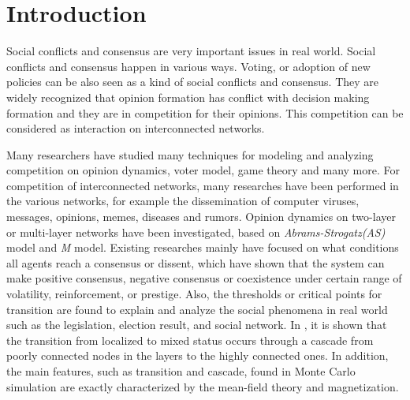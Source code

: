\documentclass[review]{elsarticle}
\begin{document}
\section{Introduction}
Social conflicts and consensus are very important issues in real world. Social conflicts and consensus happen in various ways. Voting, or adoption of new policies can be also seen as a kind of social conflicts and consensus. They are widely recognized that opinion formation has conflict with decision making formation and they are in competition for their opinions. This competition can be considered as interaction on interconnected networks\cite{bianconi2018,domenico2013,tomasini2015,kimsangwoo2012,newman2010,boccaletti2014,mikko2014,fangwu2004}. 

Many researchers have studied many techniques for modeling and analyzing competition on opinion dynamics\cite{amato2017,quattrociocchi2014,haibo2017, hua2014}, voter model\cite{redner2017}, game theory\cite{smyrnakis2019} and many more\cite{danziger2019,namkhanhvu2017,laguna2004,masuda2014,zuev2012, shenyu2018, zhou2018}.  For competition of interconnected networks, many researches have been performed in the various networks, for example the dissemination of computer viruses, messages, opinions, memes, diseases and rumors\cite{hua2014,shenyu2018, zhou2018, alvarez2016,gomez2015,diep2017,rocca2014,velasquez2018}. Opinion dynamics on two-layer or multi-layer networks have been investigated, based on \textit{Abrams-Strogatz(AS)} model\cite{abrams2003,vazquez2010} and \textit{M} model\cite{rocca2014}. Existing researches mainly have focused on what conditions all agents reach a consensus or dissent, which have shown that the system can make positive consensus, negative consensus or coexistence under certain range of volatility, reinforcement, or prestige. Also, the thresholds or critical points for transition are found to explain and analyze the social phenomena in real world such as the legislation, election result, and social network\cite{amato2017, alvarez2016, diep2017}. In \cite{gomez2015}, it is shown that the transition from localized to mixed status occurs through a cascade from poorly connected nodes in the layers to the highly connected ones. In addition, the main features, such as transition and cascade, found in Monte Carlo simulation are exactly characterized by the mean-field theory and magnetization\cite{amato2017, alvarez2016, gomez2015, diep2017}.   
\end{document}
